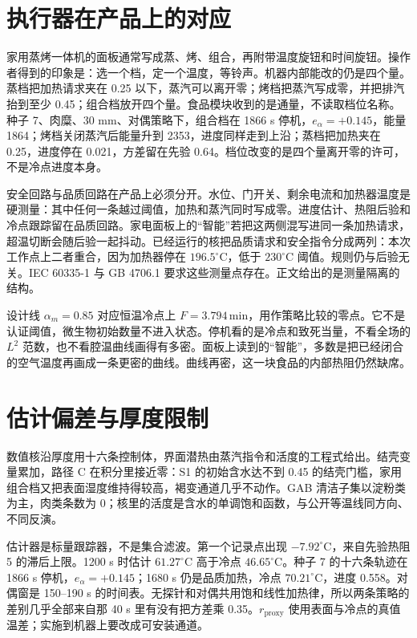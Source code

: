 \section{执行器在产品上的对应}

家用蒸烤一体机的面板通常写成蒸、烤、组合，再附带温度旋钮和时间旋钮。操作者得到的印象是：选一个档，定一个温度，等铃声。机器内部能改的仍是四个量。蒸档把加热请求夹在 0.25 以下，蒸汽可以离开零；烤档把蒸汽写成零，并把排汽抬到至少 0.45；组合档放开四个量。食品模块收到的是通量，不读取档位名称。种子 7、肉糜、30 mm、对偶策略下，组合档在 1866 s 停机，\(e_{\alpha}=+0.145\)，能量 1864；烤档关闭蒸汽后能量升到 2353，进度同样走到上沿；蒸档把加热夹在 0.25，进度停在 0.021，方差留在先验 0.64。档位改变的是四个量离开零的许可，不是冷点进度本身。

安全回路与品质回路在产品上必须分开。水位、门开关、剩余电流和加热器温度是硬测量：其中任何一条越过阈值，加热和蒸汽同时写成零。进度估计、热阻后验和冷点跟踪留在品质回路。家电面板上的“智能”若把这两侧混写进同一条加热请求，超温切断会随后验一起抖动。已经运行的核把品质请求和安全指令分成两列：本次工作点上二者重合，因为加热器停在 \(196.5^\circ\mathrm{C}\)，低于 \(230^\circ\mathrm{C}\) 阈值。规则仍与后验无关。IEC 60335-1 与 GB 4706.1 要求这些测量点存在。正文给出的是测量隔离的结构。

设计线 \(\alpha_m=0.85\) 对应恒温冷点上 \(F=3.794\,\mathrm{min}\)，用作策略比较的零点。它不是认证阈值，微生物初始数量不进入状态。停机看的是冷点和致死当量，不看全场的 \(L^2\) 范数，也不看腔温曲线画得有多密。面板上读到的“智能”，多数是把已经闭合的空气温度再画成一条更密的曲线。曲线再密，这一块食品的内部热阻仍然缺席。

\section{估计偏差与厚度限制}

数值核沿厚度用十六条控制体，界面潜热由蒸汽指令和活度的工程式给出。结壳变量累加，路径 C 在积分里接近零：S1 的初始含水达不到 0.45 的结壳门槛，家用组合档又把表面湿度维持得较高，褐变通道几乎不动作。GAB 清洁子集以淀粉类为主，肉类条数为 0；核里的活度是含水的单调饱和函数，与公开等温线同方向、不同反演。

估计器是标量跟踪器，不是集合滤波。第一个记录点出现 \(-7.92^\circ\mathrm{C}\)，来自先验热阻 5 的滞后上限。1200 s 时估计 \(61.27^\circ\mathrm{C}\) 高于冷点 \(46.65^\circ\mathrm{C}\)。种子 7 的十六条轨迹在 1866 s 停机，\(e_{\alpha}=+0.145\)；1680 s 仍是品质加热，冷点 \(70.21^\circ\mathrm{C}\)，进度 0.558。对偶窗是 150--190 s 的时间表。无探针和对偶共用饱和线性加热律，所以两条策略的差别几乎全部来自那 40 s 里有没有把方差乘 0.35。\(r_{\mathrm{proxy}}\) 使用表面与冷点的真值温差；实施到机器上要改成可安装通道。

